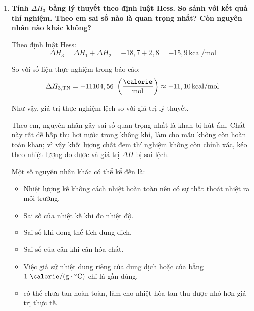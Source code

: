 \begin{enumerate}
        Trong cả hai trường hợp, bản chất của phản ứng trung hòa với base mạnh đều là:
        \begin{equation}
            \ce{H+ + OH- -> H2O}
        \end{equation}

        Vì vậy, nhiệt hiệu ứng của phản ứng trung hòa gần như giống nhau. Nếu có sai khác thì chủ yếu là do sai số thực nghiệm nhỏ.

    \item \textbf{Tính \(\Delta H_3\) bằng lý thuyết theo định luật Hess. So sánh với kết quả thí nghiệm. Theo em sai số nào là quan trọng nhất? Còn nguyên nhân nào khác không?}

        Theo định luật Hess:
        \begin{equation}
            \Delta H_3 = \Delta H_1 + \Delta H_2 = -18,7 + 2,8 = -15,9\,\text{kcal/mol}
        \end{equation}

        So với số liệu thực nghiệm trong báo cáo:
        \begin{equation}
            \Delta H_{3,\text{TN}} = -11104,56\ \left(\frac{\si{\calorie}}{\si{\mole}}\right) \approx -11,10\,\text{kcal/mol}
        \end{equation}

        Như vậy, giá trị thực nghiệm lệch so với giá trị lý thuyết.

        Theo em, nguyên nhân gây sai số quan trọng nhất là  khan bị hút ẩm. Chất này rất dễ hấp thụ hơi nước trong không khí, làm cho mẫu không còn hoàn toàn khan; vì vậy khối lượng chất đem thí nghiệm không còn chính xác, kéo theo nhiệt lượng đo được và giá trị \(\Delta H\) bị sai lệch.

        Một số nguyên nhân khác có thể kể đến là:
        \begin{itemize}
            \item Nhiệt lượng kế không cách nhiệt hoàn toàn nên có sự thất thoát nhiệt ra môi trường.
            \item Sai số của nhiệt kế khi đo nhiệt độ.
            \item Sai số khi đong thể tích dung dịch.
            \item Sai số của cân khi cân hóa chất.
            \item Việc giả sử nhiệt dung riêng của dung dịch hoặc của  bằng \(1\ \si{\calorie} / (\si{\gram} \cdot \si{\celsius})\) chỉ là gần đúng.
            \item {} có thể chưa tan hoàn toàn, làm cho nhiệt hòa tan thu được nhỏ hơn giá trị thực tế.
        \end{itemize}
\end{enumerate}